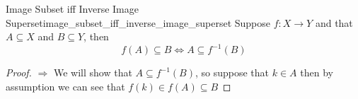 \begin{proposition}{Image Subset iff Inverse Image
Superset}{image_subset_iff_inverse_image_superset}
Suppose \( f : X \to Y  \) and that \( A \subseteq X \) and \( B \subseteq Y \),
then
\[
f\left( A \right) \subseteq B \iff  A \subseteq f ^{-1} \left( B \right) 
\]
\end{proposition}
\begin{proof}
   \( \Rightarrow  \) We will show that \( A \subseteq f ^{-1} \left( B \right)
   \), so suppose that \( k \in  A \) then by assumption we can see that \(
   f\left( k \right) \in f\left( A \right) \subseteq B \) 
\end{proof}
